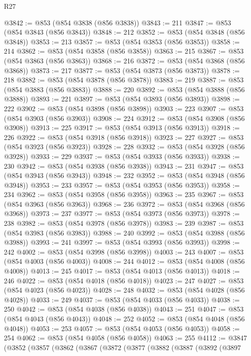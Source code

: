 \begin{lexlean}{R27}
\begin{coremodule}
@3842 := @853 (@854 @3838 (@856 @3838))
@3843 := 211
@3847 := @853 (@854 @3843 (@856 @3843))
@3848 := 212
@3852 := @853 (@854 @3848 (@856 @3848))
@3853 := 213
@3857 := @853 (@854 @3853 (@856 @3853))
@3858 := 214
@3862 := @853 (@854 @3858 (@856 @3858))
@3863 := 215
@3867 := @853 (@854 @3863 (@856 @3863))
@3868 := 216
@3872 := @853 (@854 @3868 (@856 @3868))
@3873 := 217
@3877 := @853 (@854 @3873 (@856 @3873))
@3878 := 218
@3882 := @853 (@854 @3878 (@856 @3878))
@3883 := 219
@3887 := @853 (@854 @3883 (@856 @3883))
@3888 := 220
@3892 := @853 (@854 @3888 (@856 @3888))
@3893 := 221
@3897 := @853 (@854 @3893 (@856 @3893))
@3898 := 222
@3902 := @853 (@854 @3898 (@856 @3898))
@3903 := 223
@3907 := @853 (@854 @3903 (@856 @3903))
@3908 := 224
@3912 := @853 (@854 @3908 (@856 @3908))
@3913 := 225
@3917 := @853 (@854 @3913 (@856 @3913))
@3918 := 226
@3922 := @853 (@854 @3918 (@856 @3918))
@3923 := 227
@3927 := @853 (@854 @3923 (@856 @3923))
@3928 := 228
@3932 := @853 (@854 @3928 (@856 @3928))
@3933 := 229
@3937 := @853 (@854 @3933 (@856 @3933))
@3938 := 230
@3942 := @853 (@854 @3938 (@856 @3938))
@3943 := 231
@3947 := @853 (@854 @3943 (@856 @3943))
@3948 := 232
@3952 := @853 (@854 @3948 (@856 @3948))
@3953 := 233
@3957 := @853 (@854 @3953 (@856 @3953))
@3958 := 234
@3962 := @853 (@854 @3958 (@856 @3958))
@3963 := 235
@3967 := @853 (@854 @3963 (@856 @3963))
@3968 := 236
@3972 := @853 (@854 @3968 (@856 @3968))
@3973 := 237
@3977 := @853 (@854 @3973 (@856 @3973))
@3978 := 238
@3982 := @853 (@854 @3978 (@856 @3978))
@3983 := 239
@3987 := @853 (@854 @3983 (@856 @3983))
@3988 := 240
@3992 := @853 (@854 @3988 (@856 @3988))
@3993 := 241
@3997 := @853 (@854 @3993 (@856 @3993))
@3998 := 242
@4002 := @853 (@854 @3998 (@856 @3998))
@4003 := 243
@4007 := @853 (@854 @4003 (@856 @4003))
@4008 := 244
@4012 := @853 (@854 @4008 (@856 @4008))
@4013 := 245
@4017 := @853 (@854 @4013 (@856 @4013))
@4018 := 246
@4022 := @853 (@854 @4018 (@856 @4018))
@4023 := 247
@4027 := @853 (@854 @4023 (@856 @4023))
@4028 := 248
@4032 := @853 (@854 @4028 (@856 @4028))
@4033 := 249
@4037 := @853 (@854 @4033 (@856 @4033))
@4038 := 250
@4042 := @853 (@854 @4038 (@856 @4038))
@4043 := 251
@4047 := @853 (@854 @4043 (@856 @4043))
@4048 := 252
@4052 := @853 (@854 @4048 (@856 @4048))
@4053 := 253
@4057 := @853 (@854 @4053 (@856 @4053))
@4058 := 254
@4062 := @853 (@854 @4058 (@856 @4058))
@4063 := 255
@4112 := @3847
    (@3852
      (@3857
        (@3862
          (@3867
            (@3872
              (@3877
                (@3882
                  (@3887
                    (@3892
                      (@3897

\end{coremodule}
\end{lexlean}

